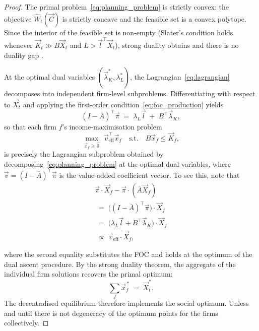 \begin{proof}
The primal problem~\eqref{eq:planning_problem} is strictly convex: the objective
$\hat{W}_t(\vec{C})$ is strictly concave and the feasible set is a convex
polytope. Since the interior of the feasible set is non-empty (Slater's
condition holds whenever $\vec{K}_t \gg B\vec{X}_t$ and $L > \vec{l}^\top
\vec{X}_t$), strong duality obtains and there is no duality gap
\citep{boyd2004convex}.

At the optimal dual variables $(\vec{\lambda}_K^*, \lambda_L^*)$, the
Lagrangian~\eqref{eq:lagrangian} decomposes into independent firm-level
subproblems. Differentiating with respect to $\vec{X}_t$ and applying the
first-order condition~\eqref{eq:foc_production} yields
\begin{equation}
    (I - \bar{A})^\top \vec{\pi} \;=\; \lambda_L \vec{l} \;+\; B^\top
    \vec{\lambda}_K,
\end{equation}
so that each firm $f$'s income-maximisation problem
\begin{equation}
    \max_{\vec{x}_f \geq \vec{0}} \;\vec{v}_\text{eff}^\top \vec{x}_f
    \quad \text{s.t.} \quad B\vec{x}_f \leq \vec{K}_f,
\end{equation}
is precisely the Lagrangian subproblem obtained by decomposing~\eqref{eq:planning_problem}
at the optimal dual variables, where $\vec{v} = (I - \bar{A})^\top\vec{\pi}$
is the value-added coefficient vector. To see this, note that
\begin{multline}
    \vec{\pi} \cdot \vec{X}_f - \vec{\pi} \cdot (\bar{A}\vec{X}_f) \\
    \;=\;  \bigl((I-\bar{A})^\top\vec{\pi}\bigr) \cdot \vec{X}_f\\
    \;=\; \bigl(\lambda_L \vec{l} + B^\top\vec{\lambda}_K\bigr)
          \cdot \vec{X}_f\\
    \;\propto\; \vec{v}_\text{eff} \cdot \vec{X}_f,
\end{multline}

where the second equality substitutes the FOC and holds at the optimum of
the dual ascent procedure. By the strong duality theorem, the aggregate of
the individual firm solutions recovers the primal optimum:
\begin{equation}
    \sum_f \vec{x}_f^{\,*} \;=\; \vec{X}_t^*.
\end{equation}
The decentralised equilibrium therefore implements the social optimum.
Unless and until there is not degeneracy of the optimum points for the firms collectively.
\end{proof}
